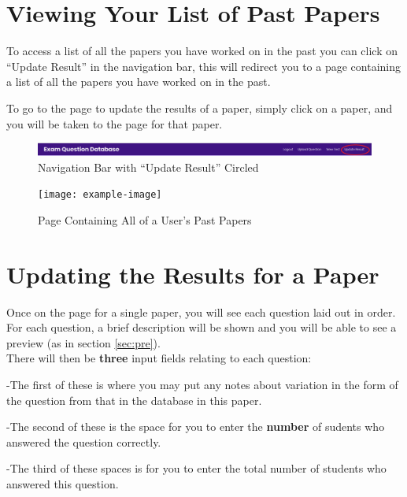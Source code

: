 \documentclass[12pt, a4paper, titlepage]{book}
\begin{document}
\section{Viewing Your List of Past Papers}
To access a list of all the papers you have worked on in the past you can click on ``Update Result'' in the navigation bar, this will redirect you to a page containing a list of all the papers you have worked on in the past.\par To go to the page to update the results of a paper, simply click on a paper, and you will be taken to the page for that paper.
\begin{figure}[htp]
\centering
\includegraphics[width =16cm]{NavBarPapRes}
\caption{Navigation Bar with ``Update Result'' Circled}
\end{figure}
\begin{figure}[H]
\centering
\texttt{[image: example-image]}
\caption{Page Containing All of a User's Past Papers}
\end{figure}
\section{Updating the Results for a Paper}
Once on the page for a single paper, you will see each question laid out in order. For each question, a brief description will be shown and you will be able to see a preview (as in section \ref{sec:pre}).
\\There will then be \textbf{three} input fields relating to each question:
\par -The first of these is where you may put any notes about variation in the form of the question from that in the database in this paper.
\par -The second of these is the space for you to enter the \textbf{number} of sudents who answered the question correctly.
\par -The third of these spaces is for you to enter the total number of students who answered this question.
\end{document}
